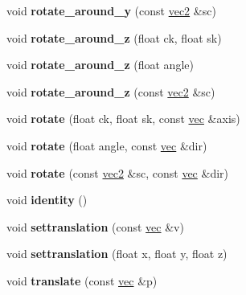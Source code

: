 \begin{DoxyCompactItemize}
void {\bfseries rotate\+\_\+around\+\_\+y} (const \hyperlink{structvec2}{vec2} \&sc)
\item 
\mbox{\label{structmatrix4_ab662c4f6da239fafd7135997c2a8a09d}} 
void {\bfseries rotate\+\_\+around\+\_\+z} (float ck, float sk)
\item 
\mbox{\label{structmatrix4_a6be99c0b44bfe9a31dc3d0c1bf9c235e}} 
void {\bfseries rotate\+\_\+around\+\_\+z} (float angle)
\item 
\mbox{\label{structmatrix4_adec854dfc8b9a07e45c32d92e0dbd53f}} 
void {\bfseries rotate\+\_\+around\+\_\+z} (const \hyperlink{structvec2}{vec2} \&sc)
\item 
\mbox{\label{structmatrix4_a4120353de8e90a0f232950cb07875ce4}} 
void {\bfseries rotate} (float ck, float sk, const \hyperlink{structvec}{vec} \&axis)
\item 
\mbox{\label{structmatrix4_a6999368d9025c62537fc4bd01ec2e1df}} 
void {\bfseries rotate} (float angle, const \hyperlink{structvec}{vec} \&dir)
\item 
\mbox{\label{structmatrix4_a22d5a0214198eb1812bb0fe6a37bdaef}} 
void {\bfseries rotate} (const \hyperlink{structvec2}{vec2} \&sc, const \hyperlink{structvec}{vec} \&dir)
\item 
\mbox{\label{structmatrix4_ad86fb87f9059e56b804f3fa912bc87be}} 
void {\bfseries identity} ()
\item 
\mbox{\label{structmatrix4_aaff4514aadc3646f56733ef585e2e390}} 
void {\bfseries settranslation} (const \hyperlink{structvec}{vec} \&v)
\item 
\mbox{\label{structmatrix4_a3c0cc361ad77dd6a4716a633f43d7b1f}} 
void {\bfseries settranslation} (float x, float y, float z)
\item 
\mbox{\label{structmatrix4_a6366f352d4d557ab8a4d547cde20f35d}} 
void {\bfseries translate} (const \hyperlink{structvec}{vec} \&p)
\item 
\mbox{\label{structmatrix4_a84021cb2ca5a6675a5223ffe84b51a0d}} 

\end{DoxyCompactItemize}
